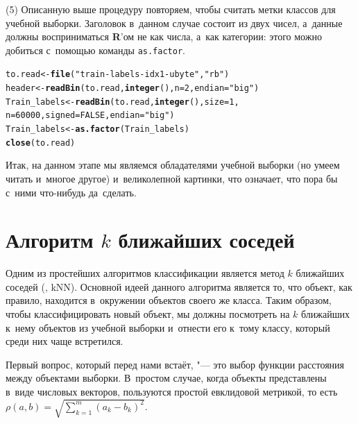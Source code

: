 \documentclass[final,pdftex]{../../template/epsilonj}\usepackage[]{graphicx}\usepackage[]{color}
\makeatletter
\newcommand{\hlnum}[1]{\textcolor[rgb]{0.686,0.059,0.569}{#1}}%
\newcommand{\hlstr}[1]{\textcolor[rgb]{0.192,0.494,0.8}{#1}}%
\newcommand{\hlstd}[1]{\textcolor[rgb]{0.345,0.345,0.345}{#1}}%
\newcommand{\hlkwb}[1]{\textcolor[rgb]{0.69,0.353,0.396}{#1}}%
\newcommand{\hlkwc}[1]{\textcolor[rgb]{0.333,0.667,0.333}{#1}}%
\newcommand{\hlkwd}[1]{\textcolor[rgb]{0.737,0.353,0.396}{\textbf{#1}}}%
\newenvironment{kframe}{%
 \def\at@end@of@kframe{}%
 \ifinner\ifhmode%
  \def\at@end@of@kframe{\end{minipage}}%
  \begin{minipage}{\columnwidth}%
 \fi\fi%
 \def\FrameCommand##1{\hskip\@totalleftmargin \hskip-\fboxsep
 \colorbox{shadecolor}{##1}\hskip-\fboxsep
     \hskip-\linewidth \hskip-\@totalleftmargin \hskip\columnwidth}%
 \MakeFramed {\advance\hsize-\width
   \@totalleftmargin\z@ \linewidth\hsize
   \@setminipage}}%
 {\par\unskip\endMakeFramed%
 \at@end@of@kframe}
\newenvironment{knitrout}{}{} %
\makeatother
\begin{document}
\par\medskip (5) Описанную выше процедуру повторяем, чтобы считать метки классов для учебной выборки. 
Заголовок в~данном случае состоит из двух чисел, а~данные должны восприниматься \textbf{R}'ом не как числа, а~как категории: этого можно добиться с~помощью команды \texttt{as.factor}.

\begin{knitrout}
\color{fgcolor}\begin{kframe}
\begin{alltt}
\hlstd{to.read} \hlkwb{<-} \hlkwd{file}\hlstd{(}\hlstr{"train-labels-idx1-ubyte"}\hlstd{,} \hlstr{"rb"}\hlstd{)}
\hlstd{header} \hlkwb{<-} \hlkwd{readBin}\hlstd{(to.read,} \hlkwd{integer}\hlstd{(),} \hlkwc{n}\hlstd{=}\hlnum{2}\hlstd{,} \hlkwc{endian}\hlstd{=}\hlstr{"big"}\hlstd{)}
\hlstd{Train_labels} \hlkwb{<-} \hlkwd{readBin}\hlstd{(to.read,} \hlkwd{integer}\hlstd{(),} \hlkwc{size} \hlstd{=} \hlnum{1}\hlstd{,}
            \hlkwc{n} \hlstd{=} \hlnum{60000}\hlstd{,} \hlkwc{signed} \hlstd{=} \hlnum{FALSE}\hlstd{,} \hlkwc{endian}\hlstd{=}\hlstr{"big"}\hlstd{)}
\hlstd{Train_labels} \hlkwb{<-} \hlkwd{as.factor}\hlstd{(Train_labels)}
\hlkwd{close}\hlstd{(to.read)}
\end{alltt}
\end{kframe}
\end{knitrout}

\par\medskip
Итак, на данном этапе мы являемся обладателями учебной выборки (но умеем читать и~многое другое) и~великолепной картинки, что означает, что пора бы с~ними что-нибудь да~сделать. 

\section{Алгоритм $k$ ближайших соседей}

Одним из простейших алгоритмов классификации является метод $k$ ближайших соседей (, kNN). 
Основной идеей данного алгоритма является то, что объект, как правило, находится в~окружении объектов своего же класса. 
Таким образом, чтобы классифицировать новый объект, мы должны посмотреть на $k$ ближайших к~нему объектов из учебной выборки и~отнести его к~тому классу, который среди них чаще встретился.

Первый вопрос, который перед нами встаёт, "--- это выбор функции расстояния между объектами выборки.
В~простом случае, когда объекты представлены в~виде числовых векторов, пользуются простой евклидовой метрикой, то есть $\rho(a, b) = \sqrt{\sum\limits_{k = 1}^m(a_k-b_k)^2}$.
\end{document}
